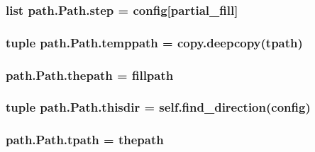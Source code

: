 \subsubsection[{step}]{\setlength{\rightskip}{0pt plus 5cm}list path.\+Path.\+step = {\bf config}\mbox{[}\textquotesingle{}partial\+\_\+fill\textquotesingle{}\mbox{]}\hspace{0.3cm}{\ttfamily [static]}}\label{classpath_1_1_path_a6369a7d2acdd80e89933c87baa92a961}
\hypertarget{classpath_1_1_path_ac029f86e7895332b5d9a4a2948e18f4f}{}
\subsubsection[{temppath}]{\setlength{\rightskip}{0pt plus 5cm}tuple path.\+Path.\+temppath = copy.\+deepcopy({\bf tpath})\hspace{0.3cm}{\ttfamily [static]}}\label{classpath_1_1_path_ac029f86e7895332b5d9a4a2948e18f4f}
\hypertarget{classpath_1_1_path_a4337dff6fcad60083e92642dd6e15dea}{}
\subsubsection[{thepath}]{\setlength{\rightskip}{0pt plus 5cm}path.\+Path.\+thepath = {\bf fillpath}\hspace{0.3cm}{\ttfamily [static]}}\label{classpath_1_1_path_a4337dff6fcad60083e92642dd6e15dea}
\hypertarget{classpath_1_1_path_aa035284a3ee351f3322692310a394019}{}
\subsubsection[{thisdir}]{\setlength{\rightskip}{0pt plus 5cm}tuple path.\+Path.\+thisdir = self.\+find\+\_\+direction({\bf config})\hspace{0.3cm}{\ttfamily [static]}}\label{classpath_1_1_path_aa035284a3ee351f3322692310a394019}
\hypertarget{classpath_1_1_path_a082ac83dbda37eba9befcae8be0df595}{}
\subsubsection[{tpath}]{\setlength{\rightskip}{0pt plus 5cm}path.\+Path.\+tpath = {\bf thepath}\hspace{0.3cm}{\ttfamily [static]}}\label{classpath_1_1_path_a082ac83dbda37eba9befcae8be0df595}
\hypertarget{classpath_1_1_path_a267b3e61d69b7d9283b8d751eda8eaab}{}
